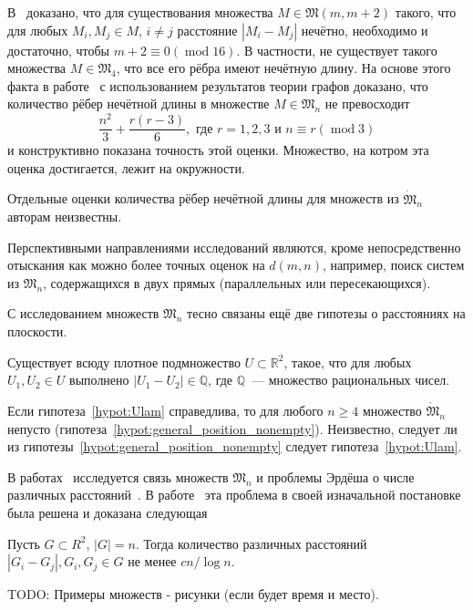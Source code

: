 В~\cite{graham1974there} доказано, что
для существования множества $M\in\mathfrak{M}(m,m+2)$ такого, что для любых
$M_i,M_j\in M$, $i\neq j$ расстояние $|M_i-M_j|$ нечётно,
необходимо и достаточно, чтобы
$m+2\equiv 0 (\operatorname{mod} 16)$.
В частности, не существует такого множества $M\in\mathfrak{M}_4$,
что все его рёбра имеют нечётную длину.
На основе этого факта в работе~\cite{piepmeyer1996maximum} с использованием результатов теории графов доказано,
что количество рёбер нечётной длины в множестве $M\in\mathfrak{M}_n$ не превосходит
\begin{equation}
	\frac{n^2}{3} + \frac{r(r - 3)}{6}, \mbox{~где~} r = 1, 2, 3 \mbox{~и~} n \equiv r (\operatorname{mod} 3)
\end{equation}
и конструктивно показана точность этой оценки.
Множество, на котром эта оценка достигается, лежит на окружности.

Отдельные оценки количества рёбер нечётной длины для множеств из $\dot{\mathfrak{M}}_n$
авторам неизвестны.








Перспективными направлениями исследований являются, кроме непосредственно отыскания как можно более точных оценок на $d(m,n)$,
например, поиск систем из $\mathfrak{M}_n$, содержащихся в двух прямых (параллельных или пересекающихся).




С исследованием множеств $\mathfrak{M}_n$ тесно связаны ещё две гипотезы о расстояниях на плоскости.
\begin{hypothesis}
	\label{hypot:Ulam}
	Существует всюду плотное подмножество $U\subset\mathbb{R}^2$, такое,
	что для любых $U_1, U_2 \in U$ выполнено $|U_1 - U_2|\in\mathbb{Q}$,
	где $\mathbb{Q}$~--- множество рациональных чисел.
\end{hypothesis}
Если гипотеза~\ref{hypot:Ulam} справедлива, то для любого $n\geq 4$ множество $\dot{\mathfrak{M}}_n$ непусто
(гипотеза~\ref{hypot:general_position_nonempty}).
Неизвестно, следует ли из
гипотезы~\ref{hypot:general_position_nonempty} следует гипотеза~\ref{hypot:Ulam}.


В работах~\cite{garibaldi2005erdos,garibaldi2011erdos} исследуется связь множеств $\mathfrak{M}_n$ и
проблемы Эрдёша о числе различных расстояний~\cite{erdos1946sets}.
В работе~\cite{guth2015erdos} эта проблема в своей изначальной постановке была решена и доказана следующая
\begin{theorem}
	Пусть $G\subset{R}^2$, $|G| = n$.
	Тогда количество различных расстояний $|G_i - G_j|, G_i,G_j \in G$
	не менее $cn/\log n $.
\end{theorem}




TODO: Примеры множеств - рисунки (если будет время и место).

